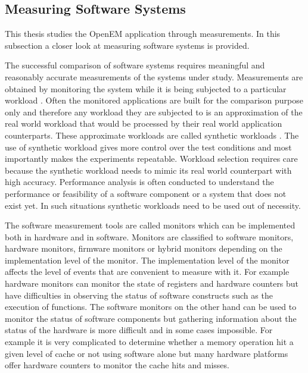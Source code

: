 \subsection{Measuring Software Systems}
\label{subsec:measure}
This thesis studies the OpenEM application through measurements. In this subsection a closer look at measuring software systems is provided.

The successful comparison of software systems requires meaningful and reasonably accurate measurements of the systems under study. Measurements are obtained by monitoring the system while it is being subjected to a particular workload \cite{jain1991art}. Often the monitored applications are built for the comparison purpose only and therefore any workload they are subjected to is an approximation of the real world workload that would be processed by their real world application counterparts. These approximate workloads are called synthetic workloads \cite{jain1991art}. The use of synthetic workload gives more control over the test conditions and most importantly makes the experiments repeatable. Workload selection requires care because the synthetic workload needs to mimic its real world counterpart with high accuracy. Performance analysis is often conducted to understand the performance or feasibility of a software component or a system that does not exist yet. In such situations synthetic workloads need to be used out of necessity.  

The software measurement tools are called monitors which can be implemented both in hardware and in software. Monitors are classified to software monitors, hardware monitors, firmware monitors or hybrid monitors depending on the implementation level of the monitor. The implementation level of the monitor affects the level of events that are convenient to measure with it. For example hardware monitors can monitor the state of registers and hardware counters but have difficulties in observing the status of software constructs such as the execution of functions. The software monitors on the other hand can be used to monitor the status of software components but gathering information about the status of the hardware is more difficult and in some cases impossible. \cite{jain1991art} For example it is very complicated to determine whether a memory operation hit a given level of cache or not using software alone but many hardware platforms offer hardware counters to monitor the cache hits and misses.


